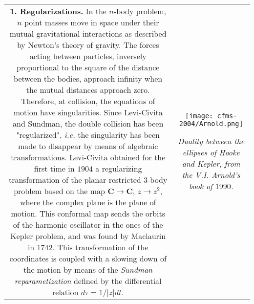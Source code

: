 \documentclass[10pt,a4paper]{article}
\def\noi{\noindent}
\theoremstyle{definition}
\begin{document}
\noi \begin{tabular}{cc}
\begin{minipage}[t]{12.42cm} \vspace*{-0.0cm} \footnotesize
\noi \textbf{1. Regularizations.}
In the $n$-body problem, $n$ point masses move in space under their mutual gravitational interactions as described by Newton's theory of gravity. The forces acting between particles, inversely proportional to the square of the distance between the bodies, approach infinity when the mutual distances approach zero. Therefore, at collision, the equations of motion have singularities. Since Levi-Civita and Sundman, the double collision has been "regularized", \emph{i.e.} the singularity has been made to disappear by means of algebraic transformations. Levi-Civita obtained for the first time in $1904$ a regularizing transformation of the planar restricted 3-body problem based on the map $\mathbf{C} \to \mathbf{C}$,
$z \to z^2$, where the complex plane is the plane of motion. This conformal map sends the orbits of the harmonic oscillator in the ones of the Kepler problem, and was found by Maclaurin in $1742$. This transformation of the coordinates is coupled with a slowing down of the motion by means of the \textit{Sundman reparametization} defined by the differential relation $d\tau = 1/|z| dt$. 
\end{minipage} &
\begin{minipage}[t]{6.0cm} \vspace*{-0.0cm}
\begin{center} \centering \texttt{[image: cfms-2004/Arnold.png]} \end{center}
\emph{Duality between the ellipses of Hooke and Kepler, from the V.I. Arnold's book of $1990$. }
\end{minipage}\\
\end{tabular}
\end{document}
